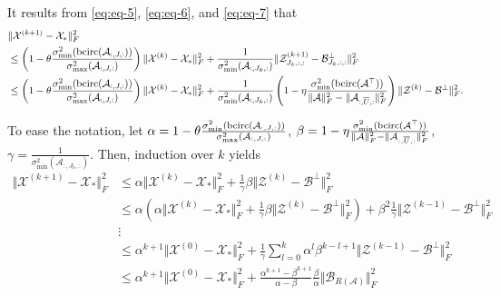 \documentclass[aspectratio=169]{beamer}
\def\bcirc{{\rm bcirc}}
\def\fm#1{\mathcal{#1}}
\def\fm#1{\mathcal{#1}}
\def \a#1{\fm A_{:, #1, :}}
\def \z#1#2{\fm Z^{(#1)}_{#2, :, :}}
\def \bp#1{\fm B^{\perp}_{#1, :, :}}
\def \x#1{\fm X^{(#1)}}
\begin{document}
\begin{frame}{}
\scriptsize
It results from  \eqref{eq:eq-5}, \eqref{eq:eq-6}, and \eqref{eq:eq-7} that
\begin{align*}
 & \Vert \x{k+1} - \fm X_\ast \Vert_F^2 \\
 &  \leq \left( 1 - \theta \frac{\sigma_{\min}^2(\bcirc(\a{J}))}{\sigma^2_{\max}(\a{J})}\right) \Vert \x k - \fm X_\ast \Vert_F^2 +  \frac{1}{\sigma_{\min}^2(\a{J_k})} \Vert  \z{k+1}{J_k} - \bp{J_k} \Vert_F^2\\
 & \leq \left( 1 - \theta \frac{\sigma_{\min}^2(\bcirc(\a{J}))}{\sigma^2_{\max}(\a{J})}\right) \Vert \x k - \fm X_\ast \Vert_F^2 + \frac{1}{\sigma_{\min}^2(\a{J_k})} \left( 1 - \eta  \frac{\sigma_{\min}^2(\bcirc(\fm A^\top))}{\Vert \fm A \Vert_F^2 - \Vert \a{\overline{U}} \Vert_F^2}   \right) \Vert  \fm Z^{(k)} - \fm B^\perp \Vert_F^2 .
\end{align*}
    
\end{frame}
\begin{frame}{}
To ease the notation, let $\alpha =  1 - \theta \frac{\sigma_{\min}^2(\bcirc(\a{J}))}{\sigma^2_{\max}(\a{J})}$, $\beta = 1 - \eta  \frac{\sigma_{\min}^2(\bcirc(\fm A^\top))}{\Vert \fm A \Vert_F^2 - \Vert \a{\overline{U}} \Vert_F^2}  $, \; $\gamma =\frac{1}{\sigma_{\min}^2(\a{J_k})}$. Then, induction over $k$ yields
\begin{align*}
    \Vert \x{k+1} - \fm X_\ast \Vert_F^2  & \leq \alpha  \Vert \x k - \fm X_\ast \Vert_F^2 + \frac{1}{\gamma}\beta \Vert \fm Z^{(k)} - \fm B^\perp \Vert_F^2\\
    & \leq \alpha \left( \alpha  \Vert \x k - \fm X_\ast \Vert_F^2 + \frac{1}{\gamma}\beta \Vert \fm Z^{(k)} - \fm B^\perp \Vert_F^2 \right) + \beta^2 \frac{1}{\gamma} \Vert \fm Z^{(k-1)} - \fm B^\perp \Vert_F^2\\
    &\vdots\\
    & \leq \alpha^{k+1} \Vert \x 0 - \fm X_\ast \Vert_F^2  + \frac{1}{\gamma}\sum_{l=0}^k \alpha^{l} \beta^{k-l+1}  \Vert \fm Z^{(k-1)} - \fm B^\perp \Vert_F^2\\
    &\leq \alpha^{k+1} \Vert \x 0 - \fm X_\ast \Vert_F^2 + \frac{\alpha^{k+1} -\beta^{k+1}}{\alpha - \beta} \frac{\beta}{\alpha}\Vert \fm B_{R(\fm A)}\Vert_F^2
\end{align*}


\end{frame}

\end{document}
